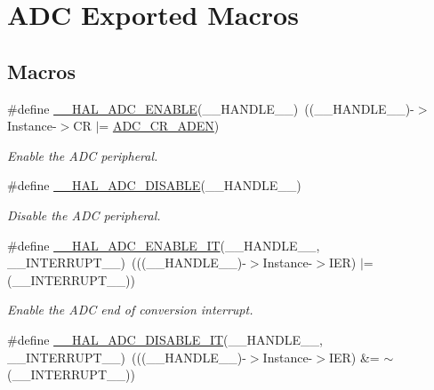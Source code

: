 \hypertarget{group___a_d_c___exported___macros}{}\section{A\+DC Exported Macros}
\label{group___a_d_c___exported___macros}
\subsection*{Macros}
\begin{DoxyCompactItemize}
\item 
\#define \hyperlink{group___a_d_c___exported___macros_gaadf16862da7593def189559423c287f4}{\+\_\+\+\_\+\+H\+A\+L\+\_\+\+A\+D\+C\+\_\+\+E\+N\+A\+B\+LE}(\+\_\+\+\_\+\+H\+A\+N\+D\+L\+E\+\_\+\+\_\+)~((\+\_\+\+\_\+\+H\+A\+N\+D\+L\+E\+\_\+\+\_\+)-\/$>$Instance-\/$>$CR $\vert$= \hyperlink{group___peripheral___registers___bits___definition_ga26fe09dfd6969dd95591942e80cc3d2b}{A\+D\+C\+\_\+\+C\+R\+\_\+\+A\+D\+EN})
\begin{DoxyCompactList}\small\item\em Enable the A\+DC peripheral. \end{DoxyCompactList}\item 
\#define \hyperlink{group___a_d_c___exported___macros_ga8afd5963c41c0a30c5cf1fec5c5710b3}{\+\_\+\+\_\+\+H\+A\+L\+\_\+\+A\+D\+C\+\_\+\+D\+I\+S\+A\+B\+LE}(\+\_\+\+\_\+\+H\+A\+N\+D\+L\+E\+\_\+\+\_\+)
\begin{DoxyCompactList}\small\item\em Disable the A\+DC peripheral. \end{DoxyCompactList}\item 
\#define \hyperlink{group___a_d_c___exported___macros_ga650073de508d335d0a1c7bf9b4d07afe}{\+\_\+\+\_\+\+H\+A\+L\+\_\+\+A\+D\+C\+\_\+\+E\+N\+A\+B\+L\+E\+\_\+\+IT}(\+\_\+\+\_\+\+H\+A\+N\+D\+L\+E\+\_\+\+\_\+,  \+\_\+\+\_\+\+I\+N\+T\+E\+R\+R\+U\+P\+T\+\_\+\+\_\+)~(((\+\_\+\+\_\+\+H\+A\+N\+D\+L\+E\+\_\+\+\_\+)-\/$>$Instance-\/$>$I\+ER) $\vert$= (\+\_\+\+\_\+\+I\+N\+T\+E\+R\+R\+U\+P\+T\+\_\+\+\_\+))
\begin{DoxyCompactList}\small\item\em Enable the A\+DC end of conversion interrupt. \end{DoxyCompactList}\item 
\#define \hyperlink{group___a_d_c___exported___macros_gadcec48b44a2133effd20f41ab227edb9}{\+\_\+\+\_\+\+H\+A\+L\+\_\+\+A\+D\+C\+\_\+\+D\+I\+S\+A\+B\+L\+E\+\_\+\+IT}(\+\_\+\+\_\+\+H\+A\+N\+D\+L\+E\+\_\+\+\_\+,  \+\_\+\+\_\+\+I\+N\+T\+E\+R\+R\+U\+P\+T\+\_\+\+\_\+)~(((\+\_\+\+\_\+\+H\+A\+N\+D\+L\+E\+\_\+\+\_\+)-\/$>$Instance-\/$>$I\+ER) \&= $\sim$(\+\_\+\+\_\+\+I\+N\+T\+E\+R\+R\+U\+P\+T\+\_\+\+\_\+))

\end{DoxyCompactItemize}
